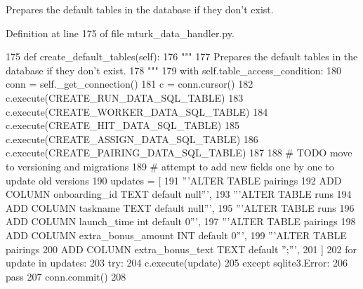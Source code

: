 \begin{DoxyVerb}Prepares the default tables in the database if they don't exist.
\end{DoxyVerb}
 

Definition at line 175 of file mturk\+\_\+data\+\_\+handler.\+py.


\begin{DoxyCode}
175     \textcolor{keyword}{def }create\_default\_tables(self):
176         \textcolor{stringliteral}{"""}
177 \textcolor{stringliteral}{        Prepares the default tables in the database if they don't exist.}
178 \textcolor{stringliteral}{        """}
179         with self.table\_access\_condition:
180             conn = self.\_get\_connection()
181             c = conn.cursor()
182             c.execute(CREATE\_RUN\_DATA\_SQL\_TABLE)
183             c.execute(CREATE\_WORKER\_DATA\_SQL\_TABLE)
184             c.execute(CREATE\_HIT\_DATA\_SQL\_TABLE)
185             c.execute(CREATE\_ASSIGN\_DATA\_SQL\_TABLE)
186             c.execute(CREATE\_PAIRING\_DATA\_SQL\_TABLE)
187 
188             \textcolor{comment}{# TODO move to versioning and migrations}
189             \textcolor{comment}{# attempt to add new fields one by one to update old versions}
190             updates = [
191                 \textcolor{stringliteral}{'''ALTER TABLE pairings}
192 \textcolor{stringliteral}{                   ADD COLUMN onboarding\_id TEXT default null'''},
193                 \textcolor{stringliteral}{'''ALTER TABLE runs}
194 \textcolor{stringliteral}{                   ADD COLUMN taskname TEXT default null'''},
195                 \textcolor{stringliteral}{'''ALTER TABLE runs}
196 \textcolor{stringliteral}{                   ADD COLUMN launch\_time int default 0'''},
197                 \textcolor{stringliteral}{'''ALTER TABLE pairings}
198 \textcolor{stringliteral}{                   ADD COLUMN extra\_bonus\_amount INT default 0'''},
199                 \textcolor{stringliteral}{'''ALTER TABLE pairings}
200 \textcolor{stringliteral}{                   ADD COLUMN extra\_bonus\_text TEXT default '';'''},
201             ]
202             \textcolor{keywordflow}{for} update \textcolor{keywordflow}{in} updates:
203                 \textcolor{keywordflow}{try}:
204                     c.execute(update)
205                 \textcolor{keywordflow}{except} sqlite3.Error:
206                     \textcolor{keywordflow}{pass}
207             conn.commit()
208 
\end{DoxyCode}
\mbox{\label{classparlai_1_1mturk_1_1core_1_1dev_1_1mturk__data__handler_1_1MTurkDataHandler_a46feee52b8950688e8d916dcd263d2c1}} 
